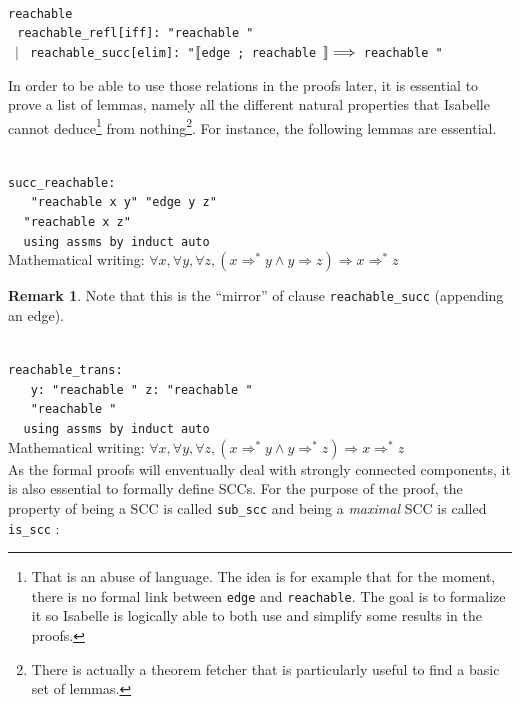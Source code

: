 \documentclass[a4 paper, 12pt]{article}
\newcommand{\ldb}{\mathopen{\ooalign{\makebox[.4em][l]{$\lbrack$}\cr\makebox[.4em][r]{$\lbrack$}\cr}}}
\newcommand{\rdb}{\mathclose{\ooalign{\makebox[.4em][l]{$\rbrack$}\cr\makebox[.4em][r]{$\rbrack$}\cr}}}
\newcommand{\inductive}{{\color{isa_blue}{inductive}}}
\newcommand{\lm}{{\color{isa_blue}{lemma}}}
\newcommand{\where}{{\color{isa_green}{where}}}
\renewcommand{\and}{{\color{isa_green}{and}}}
\newcommand{\assumes}{{\color{isa_green}{assumes}}}
\newcommand{\shows}{{\color{isa_green}{shows}}}
\newcommand{\isa}[1]{\small\texttt{\\\noindent#1}}
\newcommand{\blue}[1]{{\color{isa_dark_blue}{#1}}}
\newcommand{\green}[1]{{\color{isa_dark_green}{#1}}}
\theoremstyle{definition}
\newtheorem{remark}{Remark}
\begin{document}
\isa{
    \inductive{} reachable \where\\
    $~~~$reachable\_refl[iff]: "reachable \green{x x}"\\
    $~\mid$ reachable\_succ[elim]: "$\ldb$edge \green{x y}; reachable \green{y z}$\rdb \Longrightarrow$ reachable \green{x z}"\\
}

In order to be able to use those relations in the proofs later, it is essential to prove a list of lemmas, namely all the different natural properties that Isabelle cannot deduce\footnote{That is an abuse of language. The idea is for example that for the moment, there is no formal link between \texttt{edge} and \texttt{reachable}. The goal is to formalize it so Isabelle is logically able to both use and simplify some results in the proofs.} from nothing\footnote{There is actually a theorem fetcher that is particularly useful to find a basic set of lemmas.}. For instance, the following lemmas are essential.

\isa{
\lm{} succ\_reachable:\\
$~~~~~$\assumes{} "reachable {\color{isa_dark_blue}x y}" \and{} "edge {\color{isa_dark_blue}y z}"\\
$~~~~~$\shows "reachable {\color{isa_dark_blue}x z}"\\
$~~~~~${\color{isa_blue}using} assms {\color{isa_blue}by} induct auto\\
}
Mathematical writing: $\forall x, \forall y, \forall z, (x \Rightarrow^* y \wedge y \Rightarrow z) \Longrightarrow x \Rightarrow^* z$

\begin{remark}
    Note that this is the ``mirror'' of clause \texttt{reachable\_succ} (appending an edge).
\end{remark}

\isa{
\lm{} reachable\_trans:\\
$~~~~~$\assumes{} y: "reachable \blue{x y}" \and{} z: "reachable \blue{y z}"\\
$~~~~~$\shows{} "reachable \blue{x z}"\\
$~~~~~${\color{isa_blue}using} assms {\color{isa_blue}by} induct auto\\
}
Mathematical writing: $\forall x, \forall y, \forall z, (x \Rightarrow^* y \wedge y \Rightarrow^* z) \Longrightarrow x \Rightarrow^* z$\\

As the formal proofs will enventually deal with strongly connected components, it is also essential to formally define SCCs. For the purpose of the proof, the property of being a SCC is called \texttt{sub\_scc} and being a \textit{maximal} SCC is called \texttt{is\_scc} :
\end{document}
